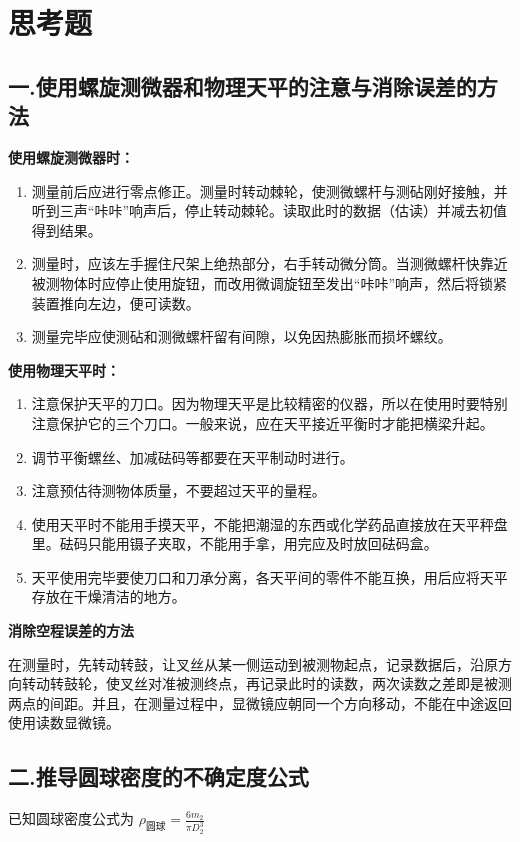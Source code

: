 \documentclass[UTF8]{ctexart}
\begin{document}
\section{思考题}
\subsection{一.使用螺旋测微器和物理天平的注意与消除误差的方法}

\textbf{使用螺旋测微器时：}
\begin{enumerate}
    \item 测量前后应进行零点修正。测量时转动棘轮，使测微螺杆与测砧刚好接触，并听到三声“咔咔”响声后，停止转动棘轮。读取此时的数据（估读）并减去初值得到结果。
    \item 测量时，应该左手握住尺架上绝热部分，右手转动微分筒。当测微螺杆快靠近被测物体时应停止使用旋钮，而改用微调旋钮至发出“咔咔”响声，然后将锁紧装置推向左边，便可读数。
    \item 测量完毕应使测砧和测微螺杆留有间隙，以免因热膨胀而损坏螺纹。
\end{enumerate}

\textbf{使用物理天平时：}
\begin{enumerate}
    \item 注意保护天平的刀口。因为物理天平是比较精密的仪器，所以在使用时要特别注意保护它的三个刀口。一般来说，应在天平接近平衡时才能把横梁升起。
    \item 调节平衡螺丝、加减砝码等都要在天平制动时进行。
    \item 注意预估待测物体质量，不要超过天平的量程。
    \item 使用天平时不能用手摸天平，不能把潮湿的东西或化学药品直接放在天平秤盘里。砝码只能用镊子夹取，不能用手拿，用完应及时放回砝码盒。
    \item 天平使用完毕要使刀口和刀承分离，各天平间的零件不能互换，用后应将天平存放在干燥清洁的地方。
\end{enumerate}

\begin{spacing}{1.2}
\textbf{消除空程误差的方法}

在测量时，先转动转鼓，让叉丝从某一侧运动到被测物起点，记录数据后，沿原方向转动转鼓轮，使叉丝对准被测终点，再记录此时的读数，两次读数之差即是被测两点的间距。并且，在测量过程中，显微镜应朝同一个方向移动，不能在中途返回使用读数显微镜。
\end{spacing}

\subsection{二.推导圆球密度的不确定度公式}
已知圆球密度公式为 $\rho_{\text{圆球}}=\frac{6m_2}{\pi D_2^3}$
\end{document}
